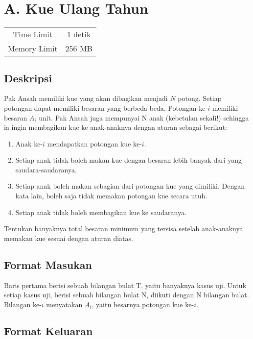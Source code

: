 \documentclass{article}
\begin{document}
\section*{\hfil A. Kue Ulang Tahun\hfil}

\begin{center}
\begin{tabular}{ |cc| } 
 \hline
 Time Limit & 1 detik \\ 
 Memory Limit & 256 MB \\
 \hline
\end{tabular}
\end{center}

\subsection*{Deskripsi}
\par Pak Ansah memiliki kue yang akan dibagikan menjadi $N$ potong. Setiap potongan dapat memiliki besaran yang berbeda-beda. Potongan ke-$i$ memiliki besaran $A_i$ unit. Pak Ansah juga mempunyai N anak (kebetulan sekali!) sehingga ia ingin membagikan kue ke anak-anaknya dengan aturan sebagai berikut:

\begin{enumerate}
\item Anak ke-$i$ mendapatkan potongan kue ke-$i$.
\item Setiap anak tidak boleh makan kue dengan besaran lebih banyak dari yang saudara-saudaranya.
\item Setiap anak boleh makan sebagian dari potongan kue yang dimiliki. Dengan kata lain, boleh saja tidak memakan potongan kue secara utuh. 
\item Setiap anak tidak boleh membagikan kue ke saudaranya. 
\end{enumerate}
Tentukan banyaknya total besaran minimum yang tersisa setelah anak-anaknya memakan kue sesuai dengan aturan diatas.

\subsection*{Format Masukan}
Baris pertama berisi sebuah bilangan bulat T, yaitu banyaknya kasus uji. \newline
Untuk setiap kasus uji, berisi sebuah bilangan bulat N, diikuti dengan N bilangan bulat. Bilangan ke-$i$ menyatakan $A_i$, yaitu besarnya potongan kue ke-$i$. 

\subsection*{Format Keluaran}
\end{document}
